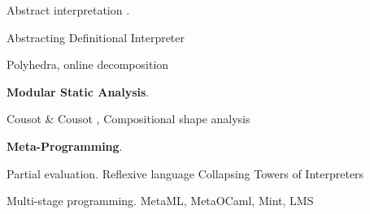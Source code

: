 Abstract interpretation \cite{DBLP:conf/popl/CousotC77}.

Abstracting Definitional Interpreter \cite{darais2017abstracting}

Polyhedra, online decomposition

\textbf{Modular Static Analysis}. 

Cousot \& Cousot \cite{DBLP:conf/cc/CousotC02}, 
Compositional shape analysis \cite{DBLP:conf/popl/CalcagnoDOY09}

\textbf{Meta-Programming}.

Partial evaluation. 
Reflexive language \cite{DBLP:conf/gpce/Asai14}
Collapsing Towers of Interpreters \cite{Amin:2017:CTI:3177123.3158140}

Multi-stage programming. MetaML, MetaOCaml, Mint, LMS


